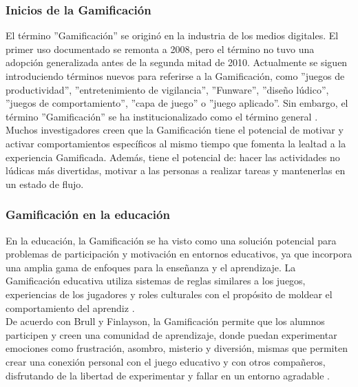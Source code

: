 \subsubsection{Inicios de la Gamificación}

    El término ''Gamificación'' se originó en la industria de los medios digitales. El primer uso documentado se remonta a 2008, pero el término no tuvo una adopción generalizada antes de la segunda mitad de 2010. Actualmente se siguen introduciendo términos nuevos para referirse a la Gamificación, como ''juegos de productividad'', ''entretenimiento de vigilancia'', ''Funware'', ''diseño lúdico'', ''juegos de comportamiento”, ”capa de juego” o ”juego aplicado”. Sin embargo, el término ”Gamificación” se ha institucionalizado como el término general \cite{definicion1}.\\
    
    
    \noindent Muchos investigadores creen que la Gamificación tiene el potencial de motivar y activar comportamientos específicos al mismo tiempo que fomenta la lealtad a la experiencia Gamificada. Además, tiene el potencial de: hacer las actividades no lúdicas más divertidas, motivar a las personas a realizar tareas y mantenerlas en un estado de flujo. \cite{education1}\\

\clearpage
\subsubsection{Gamificación en la educación}
   
    En la educación, la Gamificación se ha visto como una solución potencial para problemas de participación y motivación en entornos educativos, ya que incorpora una amplia gama de enfoques para la enseñanza y el aprendizaje. La Gamificación educativa utiliza sistemas de reglas similares a los juegos, experiencias de los jugadores y roles culturales con el propósito de moldear el comportamiento del aprendiz \cite{education1}.\\
    
    \noindent De acuerdo con Brull y Finlayson, la Gamificación 
    permite que los alumnos participen y creen una comunidad de aprendizaje, donde puedan experimentar emociones como frustración, asombro, misterio y diversión, mismas que permiten crear una conexión personal con el juego educativo y con otros compañeros, disfrutando de la libertad de experimentar y fallar en un entorno agradable \cite{education3}.\\ %
    
